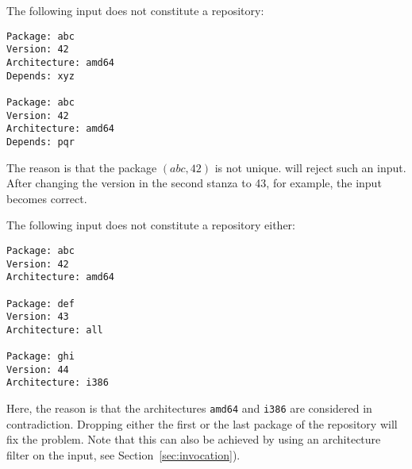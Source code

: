 \begin{example} The following input does not constitute a repository:
\begin{verbatim}
Package: abc
Version: 42
Architecture: amd64
Depends: xyz

Package: abc
Version: 42
Architecture: amd64
Depends: pqr
\end{verbatim}
The reason is that the package $(abc,42)$ is not unique. \debcheck{}
will reject such an input. After changing the version in the second
stanza to 43, for example, the input becomes correct.
\end{example}

\begin{example} The following input does not constitute a repository either:
\begin{verbatim}
Package: abc
Version: 42
Architecture: amd64

Package: def
Version: 43
Architecture: all

Package: ghi
Version: 44
Architecture: i386
\end{verbatim}
Here, the reason is that the architectures \texttt{amd64} and
\texttt{i386} are considered in contradiction. Dropping either the
first or the last package of the repository will fix the problem. Note
that this can also be achieved by using an architecture filter on the
input, see Section~\ref{sec:invocation}).
\end{example}


